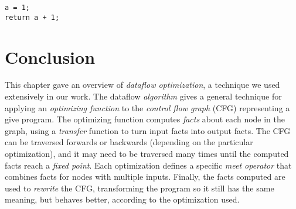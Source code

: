 \documentclass[12pt]{report}
\begin{document}
\begin{Verbatim}
a = 1;
return a + 1;
\end{Verbatim}

\section{Conclusion}

This chapter gave an overview of \emph{dataflow optimization}, a
technique we used extensively in our work. The dataflow
\emph{algorithm} gives a general technique for applying an
\emph{optimizing function} to the \emph{control flow graph} (CFG)
representing a give program. The optimizing function computes
\emph{facts} about each node in the graph, using a \emph{transfer}
function to turn input facts into output facts. The CFG can be
traversed forwards or backwards (depending on the particular
optimization), and it may need to be traversed many times until the
computed facts reach a \emph{fixed point}.  Each optimization defines
a specific \emph{meet operator} that combines facts for nodes with
multiple inputs. Finally, the facts computed are used to
\emph{rewrite} the CFG, transforming the program so it still has the
same meaning, but behaves better, according to the optimization used.





\end{document}
